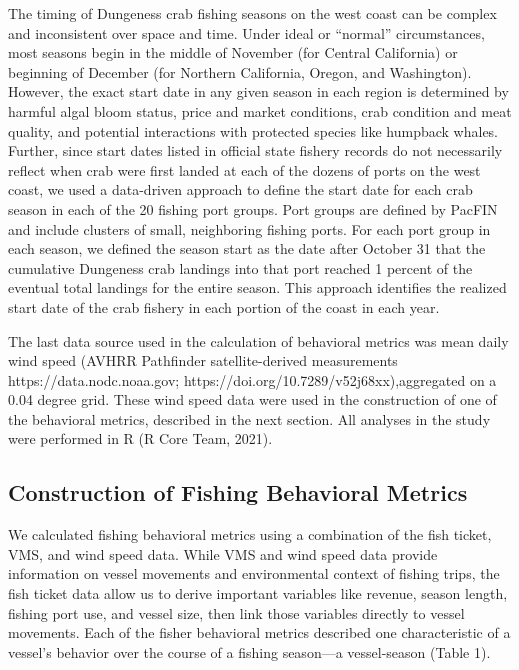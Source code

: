 \documentclass[]{elsarticle} %
\begin{document}
The timing of Dungeness crab fishing seasons on the west coast can be
complex and inconsistent over space and time. Under ideal or ``normal''
circumstances, most seasons begin in the middle of November (for Central
California) or beginning of December (for Northern California, Oregon,
and Washington). However, the exact start date in any given season in
each region is determined by harmful algal bloom status, price and
market conditions, crab condition and meat quality, and potential
interactions with protected species like humpback whales. Further, since
start dates listed in official state fishery records do not necessarily
reflect when crab were first landed at each of the dozens of ports on
the west coast, we used a data-driven approach to define the start date
for each crab season in each of the 20 fishing port groups. Port groups
are defined by PacFIN and include clusters of small, neighboring fishing
ports. For each port group in each season, we defined the season start
as the date after October 31 that the cumulative Dungeness crab landings
into that port reached 1 percent of the eventual total landings for the
entire season. This approach identifies the realized start date of the
crab fishery in each portion of the coast in each year.

The last data source used in the calculation of behavioral metrics was
mean daily wind speed (AVHRR Pathfinder satellite-derived measurements
https://data.nodc.noaa.gov; https://doi.org/10.7289/v52j68xx),aggregated
on a 0.04 degree grid. These wind speed data were used in the
construction of one of the behavioral metrics, described in the next
section. All analyses in the study were performed in R (R Core Team,
2021).

\hypertarget{construction-of-fishing-behavioral-metrics}{%
\subsection{Construction of Fishing Behavioral
Metrics}\label{construction-of-fishing-behavioral-metrics}}

We calculated fishing behavioral metrics using a combination of the fish
ticket, VMS, and wind speed data. While VMS and wind speed data provide
information on vessel movements and environmental context of fishing
trips, the fish ticket data allow us to derive important variables like
revenue, season length, fishing port use, and vessel size, then link
those variables directly to vessel movements. Each of the fisher
behavioral metrics described one characteristic of a vessel's behavior
over the course of a fishing season---a vessel-season (Table 1).
\end{document}
